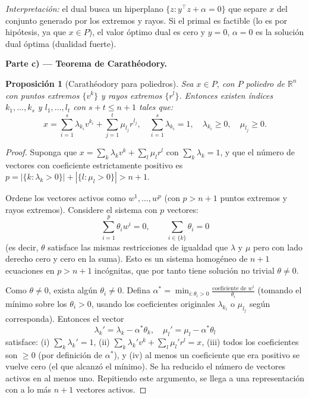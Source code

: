 \documentclass{article}
\newtheorem*{prop}{Proposición}
\begin{document}
\textit{Interpretación:} el dual busca un hiperplano $\{z : y^\top z + \alpha = 0\}$ que separe $x$ del conjunto generado por los extremos y rayos. Si el primal es factible (lo es por hipótesis, ya que $x \in P$), el valor óptimo dual es cero y $y = 0$, $\alpha = 0$ es la solución dual óptima (dualidad fuerte).

\medskip
\noindent\textbf{Parte c) — Teorema de Carathéodory.}

\begin{prop}[Carathéodory para poliedros]
Sea $x \in P$, con $P$ poliedro de $\mathbb{R}^n$ con puntos extremos $\{v^k\}$ y rayos extremos $\{r^l\}$. Entonces existen índices $k_1, \ldots, k_s$ y $l_1, \ldots, l_t$ con $s + t \leq n + 1$ tales que:
\[
x = \sum_{i=1}^{s} \lambda_{k_i} v^{k_i} + \sum_{j=1}^{t} \mu_{l_j} r^{l_j}, \quad \sum_{i=1}^s \lambda_{k_i} = 1, \quad \lambda_{k_i} \geq 0, \quad \mu_{l_j} \geq 0.
\]
\end{prop}

\begin{proof}
Suponga que $x = \sum_{k} \lambda_k v^k + \sum_l \mu_l r^l$ con $\sum_k \lambda_k = 1$, y que el número de vectores con coeficiente estrictamente positivo es $p = |\{k : \lambda_k > 0\}| + |\{l : \mu_l > 0\}| > n + 1$.

Ordene los vectores activos como $w^1, \ldots, w^p$ (con $p > n + 1$ puntos extremos y rayos extremos). Considere el sistema con $p$ vectores:
\[
\sum_{i=1}^{p} \theta_i w^i = 0, \qquad \sum_{i \in \{k\}} \theta_i = 0
\]
(es decir, $\theta$ satisface las mismas restricciones de igualdad que $\lambda$ y $\mu$ pero con lado derecho cero y cero en la suma). Esto es un sistema homogéneo de $n + 1$ ecuaciones en $p > n + 1$ incógnitas, que por tanto tiene solución no trivial $\theta \neq 0$.

Como $\theta \neq 0$, exista algún $\theta_i \neq 0$. Defina $\alpha^* = \min_{i : \theta_i > 0} \frac{\text{coeficiente de }w^i}{\theta_i}$ (tomando el mínimo sobre los $\theta_i > 0$, usando los coeficientes originales $\lambda_{k_i}$ o $\mu_{l_j}$ según corresponda). Entonces el vector
\[
\lambda_k' = \lambda_k - \alpha^* \theta_k, \quad \mu_l' = \mu_l - \alpha^* \theta_l
\]
satisface: (i) $\sum_k \lambda_k' = 1$, (ii) $\sum_k \lambda_k' v^k + \sum_l \mu_l' r^l = x$, (iii) todos los coeficientes son $\geq 0$ (por definición de $\alpha^*$), y (iv) al menos un coeficiente que era positivo se vuelve cero (el que alcanzó el mínimo). Se ha reducido el número de vectores activos en al menos uno. Repitiendo este argumento, se llega a una representación con a lo más $n + 1$ vectores activos.
\end{proof}
\end{document}
